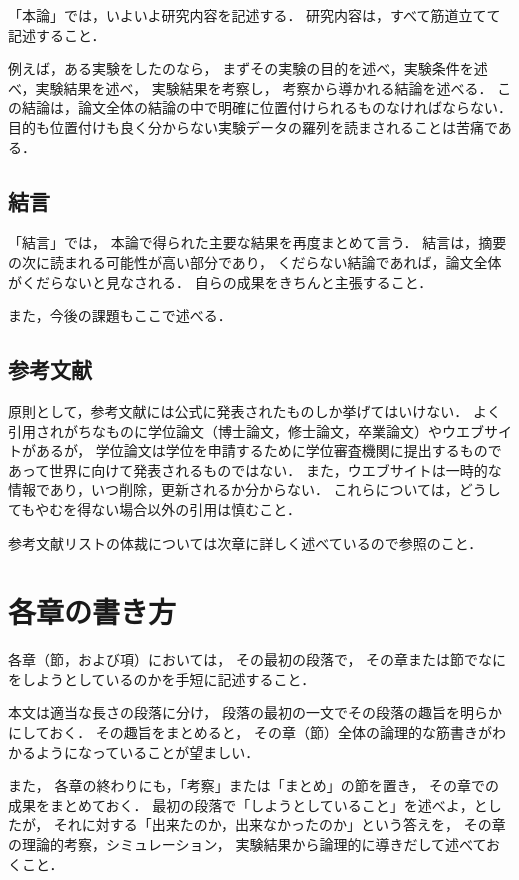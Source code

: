 「本論」では，いよいよ研究内容を記述する．
研究内容は，すべて筋道立てて記述すること．

例えば，ある実験をしたのなら，
まずその実験の目的を述べ，実験条件を述べ，実験結果を述べ，
実験結果を考察し，
考察から導かれる結論を述べる．
この結論は，論文全体の結論の中で明確に位置付けられるものなければならない．
目的も位置付けも良く分からない実験データの羅列を読まされることは苦痛である．


\subsection{結言}

「結言」では，
本論で得られた主要な結果を再度まとめて言う．
結言は，摘要の次に読まれる可能性が高い部分であり，
くだらない結論であれば，論文全体がくだらないと見なされる．
自らの成果をきちんと主張すること．

また，今後の課題もここで述べる．


\subsection{参考文献}

原則として，参考文献には公式に発表されたものしか挙げてはいけない．
よく引用されがちなものに学位論文（博士論文，修士論文，卒業論文）やウエブサイトがあるが，
学位論文は学位を申請するために学位審査機関に提出するものであって世界に向けて発表されるものではない．
また，ウエブサイトは一時的な情報であり，いつ削除，更新されるか分からない．
これらについては，どうしてもやむを得ない場合以外の引用は慎むこと．

参考文献リストの体裁については次章に詳しく述べているので参照のこと．


\section{各章の書き方}

各章（節，および項）においては，
その最初の段落で，
その章または節でなにをしようとしているのかを手短に記述すること．

本文は適当な長さの段落に分け，
段落の最初の一文でその段落の趣旨を明らかにしておく．
その趣旨をまとめると，
その章（節）全体の論理的な筋書きがわかるようになっていることが望ましい．

また，
各章の終わりにも，「考察」または「まとめ」の節を置き，
その章での成果をまとめておく．
最初の段落で「しようとしていること」を述べよ，としたが，
それに対する「出来たのか，出来なかったのか」という答えを，
その章の理論的考察，シミュレーション，
実験結果から論理的に導きだして述べておくこと．
